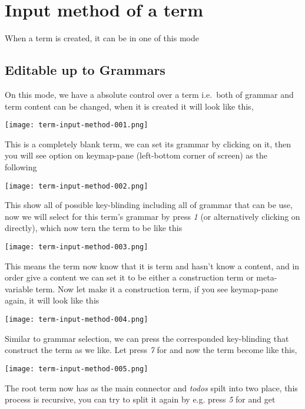 \documentclass[master.tex]{subfiles}
\begin{document}
\section{Input method of a term}

When a term is created, it can be in one of this mode

\subsection{Editable up to Grammars}
On this mode, we have a absolute control over a term i.e.\ both of grammar and
term content can be changed, when it is created it will look like this,

\centerline{\texttt{[image: term-input-method-001.png]}}

This is a completely blank term, we can set its grammar by clicking on it, then
you will see option on keymap-pane (left-bottom corner of screen) as the following

\centerline{\texttt{[image: term-input-method-002.png]}}

This show all of possible key-blinding including all of grammar that can be use,
now we will select  for this term's grammar by press \emph{1}
(or alternatively clicking on  directly), which now tern the
term to be like this

\centerline{\texttt{[image: term-input-method-003.png]}}

This means the term now know that it is  term and hasn't know a
content, and in order give a content we can set it to be either a construction
term or meta-variable term. Now let make it a construction term, if you see
keymap-pane again, it will look like this

\centerline{\texttt{[image: term-input-method-004.png]}}

Similar to grammar selection, we can press the corresponded key-blinding that
construct the term as we like. Let press \emph{7} for  and now the term become like this,

\centerline{\texttt{[image: term-input-method-005.png]}}

The root term now has \pifmt{$\rightarrow$} as the main connector and
\emph{todos} spilt into two place, this process is recursive, you can try to
split it again by e.g. press \emph{5} for  and get
\end{document}
